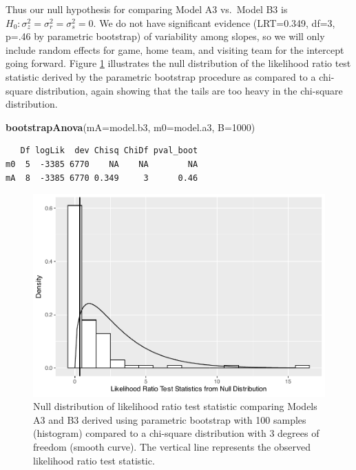 \documentclass[
]{krantz}
\newenvironment{Shaded}{\begin{snugshade}}{\end{snugshade}}
\newcommand{\AttributeTok}[1]{\textcolor[rgb]{0.27,0.27,0.27}{#1}}
\newcommand{\DecValTok}[1]{\textcolor[rgb]{0.06,0.06,0.06}{#1}}
\newcommand{\FunctionTok}[1]{\textcolor[rgb]{0.27,0.27,0.27}{\textbf{#1}}}
\newcommand{\NormalTok}[1]{#1}
\begin{document}
Thus our null hypothesis for comparing Model A3 vs.~Model B3 is \(H_{0}: \sigma_{z}^{2}=\sigma_{r}^{2}=\sigma_{s}^{2}=0\). We do not have significant evidence (LRT=0.349, df=3, p=.46 by parametric bootstrap) of variability among slopes, so we will only include random effects for game, home team, and visiting team for the intercept going forward. Figure \ref{fig:gmu-lrt3} illustrates the null distribution of the likelihood ratio test statistic derived by the parametric bootstrap procedure as compared to a chi-square distribution, again showing that the tails are too heavy in the chi-square distribution.

\begin{Shaded}
\begin{Highlighting}[]
\FunctionTok{bootstrapAnova}\NormalTok{(}\AttributeTok{mA=}\NormalTok{model.b3, }\AttributeTok{m0=}\NormalTok{model.a3, }\AttributeTok{B=}\DecValTok{1000}\NormalTok{)}
\end{Highlighting}
\end{Shaded}

\begin{verbatim}
   Df logLik  dev Chisq ChiDf pval_boot
m0  5  -3385 6770    NA    NA        NA
mA  8  -3385 6770 0.349     3      0.46
\end{verbatim}

\begin{figure}

{\centering \includegraphics[width=0.6\linewidth]{bookdown-BeyondMLR_files/figure-latex/gmu-lrt3-1} 

}

\caption{Null distribution of likelihood ratio test statistic comparing Models A3 and B3 derived using parametric bootstrap with 100 samples (histogram) compared to a chi-square distribution with 3 degrees of freedom (smooth curve).  The vertical line represents the observed likelihood ratio test statistic.}\label{fig:gmu-lrt3}
\end{figure}
\end{document}

